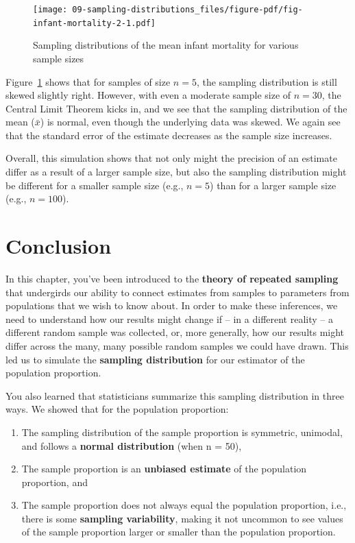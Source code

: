 \documentclass[
  letterpaper,
  DIV=11,
  numbers=noendperiod]{scrreprt}
\providecommand{\tightlist}{%
  \setlength{\itemsep}{0pt}\setlength{\parskip}{0pt}}\usepackage{longtable,booktabs,array}
\theoremstyle{definition}
\theoremstyle{remark}
\begin{document}
\begin{figure}[H]

{\centering \texttt{[image: 09-sampling-distributions\_files/figure-pdf/fig-infant-mortality-2-1.pdf]}

}

\caption{\label{fig-infant-mortality-2}Sampling distributions of the
mean infant mortality for various sample sizes}

\end{figure}

Figure~\ref{fig-infant-mortality-2} shows that for samples of size
\(n = 5\), the sampling distribution is still skewed slightly right.
However, with even a moderate sample size of \(n = 30\), the Central
Limit Theorem kicks in, and we see that the sampling distribution of the
mean (\(\bar{x}\)) is normal, even though the underlying data was
skewed. We again see that the standard error of the estimate decreases
as the sample size increases.

Overall, this simulation shows that not only might the precision of an
estimate differ as a result of a larger sample size, but also the
sampling distribution might be different for a smaller sample size
(e.g., \(n = 5\)) than for a larger sample size (e.g., \(n=100\)).

\hypertarget{conclusion}{%
\section{Conclusion}\label{conclusion}}

In this chapter, you've been introduced to the \textbf{theory of
repeated sampling} that undergirds our ability to connect estimates from
samples to parameters from populations that we wish to know about. In
order to make these inferences, we need to understand how our results
might change if -- in a different reality -- a different random sample
was collected, or, more generally, how our results might differ across
the many, many possible random samples we could have drawn. This led us
to simulate the \textbf{sampling distribution} for our estimator of the
population proportion.

You also learned that statisticians summarize this sampling distribution
in three ways. We showed that for the population proportion:

\begin{enumerate}
\def\labelenumi{\arabic{enumi}.}
\tightlist
\item
  The sampling distribution of the sample proportion is symmetric,
  unimodal, and follows a \textbf{normal distribution} (when n = 50),
\item
  The sample proportion is an \textbf{unbiased estimate} of the
  population proportion, and
\item
  The sample proportion does not always equal the population proportion,
  i.e., there is some \textbf{sampling variability}, making it not
  uncommon to see values of the sample proportion larger or smaller than
  the population proportion.
\end{enumerate}
\end{document}
